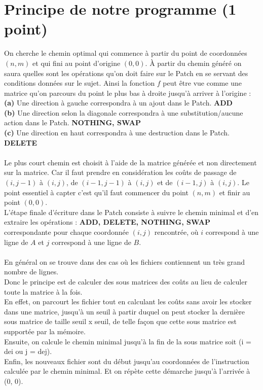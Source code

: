 \documentclass[a4paper,10pt,french]{article}
\begin{document}


\section{Principe de notre  programme (1 point)}
On cherche le chemin optimal qui commence à partir du point de coordonnées $(n, m)$ et qui fini au point d'origine $(0, 0)$. À partir du chemin généré on saura quelles sont les opérations qu'on doit faire sur le Patch en se servant des conditions données sur le sujet. Ainsi la fonction $f$ peut être vue comme une matrice qu'on parcours du point le plus bas à droite jusqu'à arriver à l'origine :\\

{\bf(a)} Une direction à gauche correspondra à un ajout dans le Patch. {\bf ADD}\\

{\bf(b)} Une direction selon la diagonale correspondra à une substitution/aucune action dans le Patch. {\bf NOTHING, SWAP}\\

{\bf(c)} Une direction en haut correspondra à une destruction dans le Patch. {\bf DELETE}\\

{\color{red}{\bf REMARQUE :}}\\

Le plus court chemin est choisit à l'aide de la matrice générée et non directement sur la matrice. Car il faut prendre en considération les coûts de passage de $(i,j-1)$ à $(i,j)$, de $(i-1,j-1)$ à $(i,j)$ et de $(i-1,j)$ à $(i,j)$. Le point essentiel à capter c'est qu'il faut commencer du point $(n, m)$ et finir au point $(0, 0)$.\\

L'étape finale d'écriture dans le Patch consiste à suivre le chemin minimal et d'en extraire les opérations : {\bf ADD, DELETE, NOTHING, SWAP} correspondante pour chaque coordonnée $(i, j)$ rencontrée, où $i$ correspond à une ligne de $A$ et $j$ correspond à une ligne de $B$.\\
{\color{red}{\bf Principe :}}\\
En général on se trouve dans des cas où les fichiers contiennent un très grand nombre de lignes.\\
Donc le principe est de calculer des sous matrices des coûts au lieu de calculer toute la matrice à la fois.\\
En effet, on parcourt les fichier tout en calculant les coûts sans avoir les stocker dans une matrice, jusqu'à un
seuil à partir duquel on peut stocker la dernière sous matrice de taille seuil x seuil, de telle façon que cette
sous matrice est supportée par la mémoire.\\
Ensuite, on calcule le chemin minimal jusqu'à la fin de la sous matrice soit (i = dei ou j = dej).\\
Enfin, les nouveaux fichier sont du début jusqu'au coordonnées de l'instruction calculée par le chemin minimal.
Et on répète cette démarche jusqu'à l'arrivée à (0, 0).\\
\end{document}
